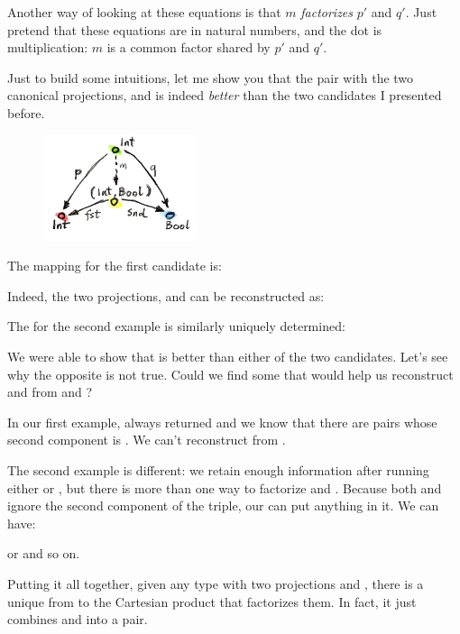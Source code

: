 \noindent
Another way of looking at these equations is that $m$
\emph{factorizes} $p'$ and $q'$. Just pretend that these
equations are in natural numbers, and the dot is multiplication:
$m$ is a common factor shared by $p'$ and $q'$.

Just to build some intuitions, let me show you that the pair
 with the two canonical projections, 
and  is indeed \emph{better} than the two candidates I
presented before.

\begin{figure}[H]
  \centering
  \includegraphics[width=0.4\textwidth]{images/not-a-product.jpg}
\end{figure}

\noindent
The mapping  for the first candidate is:

Indeed, the two projections,  and  can be
reconstructed as:

The  for the second example is similarly uniquely determined:

We were able to show that  is better than either of
the two candidates. Let's see why the opposite is not true. Could we
find some  that would help us reconstruct 
and  from  and ?

In our first example,  always returned  and we
know that there are pairs whose second component is . We
can't reconstruct  from .

The second example is different: we retain enough information after
running either  or , but there is more than one way
to factorize  and . Because both  and
 ignore the second component of the triple, our 
can put anything in it. We can have:


or
and so on.

Putting it all together, given any type  with two projections
 and , there is a unique  from 
to the Cartesian product  that factorizes them. In fact,
it just combines  and  into a pair.

